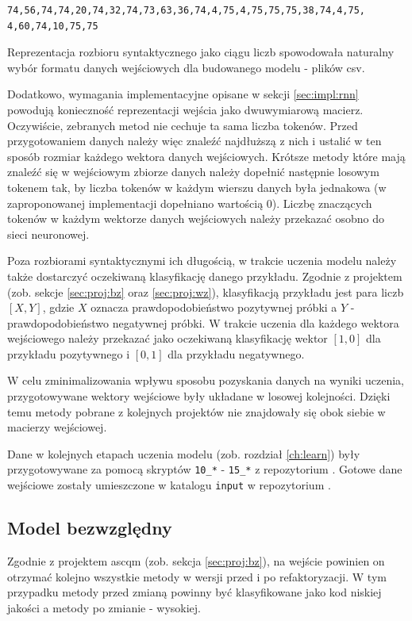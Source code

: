 \documentclass[12pt]{report}
\begin{document}
\begin{lstlisting}[frame=single,caption={Reprezentacja rozbioru syntaktycznego metody w postaci wektora liczb},captionpos=b,label={lst:impl:tokens-numbers}]
74,56,74,74,20,74,32,74,73,63,36,74,4,75,4,75,75,75,38,74,4,75, 4,60,74,10,75,75
\end{lstlisting}

Reprezentacja rozbioru syntaktycznego jako ciągu liczb spowodowała naturalny wybór formatu danych wejściowych dla budowanego modelu - plików \gls{csv}.

Dodatkowo, wymagania implementacyjne opisane w sekcji \ref{sec:impl:rnn} powodują konieczność reprezentacji wejścia jako dwuwymiarową macierz. Oczywiście, zebranych metod nie cechuje ta sama liczba tokenów. Przed przygotowaniem danych należy więc znaleźć najdłuższą z nich i ustalić w ten sposób rozmiar każdego wektora danych wejściowych. Krótsze metody które mają znaleźć się w wejściowym zbiorze danych należy dopełnić następnie losowym tokenem tak, by liczba tokenów w każdym wierszu danych była jednakowa (w zaproponowanej implementacji dopełniano wartością 0). Liczbę znaczących tokenów w każdym wektorze danych wejściowych należy przekazać osobno do sieci neuronowej.

Poza rozbiorami syntaktycznymi ich długością, w trakcie uczenia modelu należy także dostarczyć oczekiwaną klasyfikację danego przykładu. Zgodnie z projektem (zob. sekcje \ref{sec:proj:bz} oraz \ref{sec:proj:wz}), klasyfikacją przykładu jest para liczb $[X,Y]$, gdzie $X$ oznacza prawdopodobieństwo pozytywnej próbki a $Y$ - prawdopodobieństwo negatywnej próbki. W trakcie uczenia dla każdego wektora wejściowego należy przekazać jako oczekiwaną klasyfikację wektor $[1,0]$ dla przykładu pozytywnego i $[0,1]$ dla przykładu negatywnego.

W celu zminimalizowania wpływu sposobu pozyskania danych na wyniki uczenia, przygotowywane wektory wejściowe były układane w losowej kolejności. Dzięki temu metody pobrane z kolejnych projektów nie znajdowały się obok siebie w macierzy wejściowej.

Dane w kolejnych etapach uczenia modelu (zob. rozdział \ref{ch:learn}) były przygotowywane za pomocą skryptów \texttt{10\_*} - \texttt{15\_*} z repozytorium \cite{fracz:refactor-extractor}. Gotowe dane wejściowe zostały umieszczone w katalogu \texttt{input} w repozytorium \cite{fracz:code-quality-tf}.

\subsection{Model bezwzględny}
Zgodnie z projektem \gls{ascqm} (zob. sekcja \ref{sec:proj:bz}), na wejście powinien on otrzymać kolejno wszystkie metody w wersji przed i po refaktoryzacji. W tym przypadku metody przed zmianą powinny być klasyfikowane jako kod niskiej jakości a metody po zmianie - wysokiej.
\end{document}
